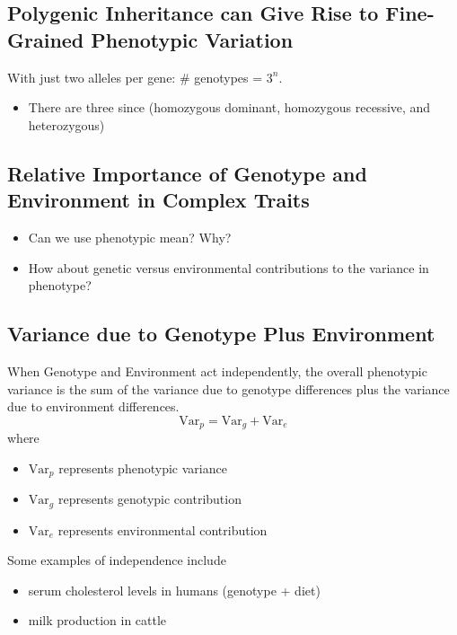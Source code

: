 \documentclass[10pt]{article}
\begin{document}
\subsection*{Polygenic Inheritance can Give Rise to Fine-Grained Phenotypic Variation}
With just two alleles per gene: \# genotypes = $3^n$.
\begin{itemize}
	\item There are three since (homozygous dominant, homozygous recessive, and heterozygous)
\end{itemize}

\subsection*{Relative Importance of Genotype and Environment in Complex Traits}
\begin{itemize}
	\item Can we use phenotypic mean?  Why?
	\item How about genetic versus environmental contributions to the variance in phenotype?
\end{itemize}

\subsection*{Variance due to Genotype Plus Environment}
When Genotype and Environment act independently, the overall phenotypic variance is the sum of the variance due to genotype differences plus the variance due to environment differences.
\[\text{Var}_p = \text{Var}_g + \text{Var}_e\]
where
\begin{itemize}
	\item $\text{Var}_p$ represents phenotypic variance
	\item $\text{Var}_g$ represents genotypic contribution
	\item $\text{Var}_e$ represents environmental contribution
\end{itemize}
Some examples of independence include
\begin{itemize}
	\item serum cholesterol levels in humans (genotype + diet)
	\item milk production in cattle
\end{itemize}
\end{document}
